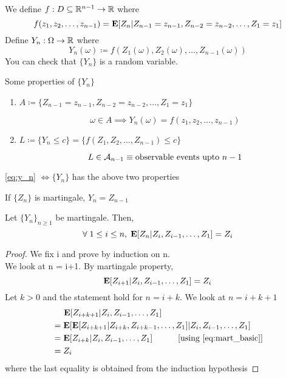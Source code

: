 \documentclass[main]{subfiles}
\begin{document}
We define $f: D \subseteq \mathbb R^{n-1} \to \mathbb R$ where
$$f(z_1, z_2, \ldots, z_{n-1}) = \mathbf E[Z_n|Z_{n-1}=z_{n-1},Z_{n-2}=z_{n-2},\ldots,Z_1=z_1]$$
Define $Y_n: \Omega \to \mathbb R$ where
\begin{equation}
    Y_n(\omega) \coloneqq f(Z_1(\omega), Z_2(\omega), \ldots, Z_{n-1}(\omega))
    \label{eq:y_n}
\end{equation}
You can check that $\{Y_n\}$ is a random variable.
\begin{property} Some properties of $\{Y_n\}$
    \begin{enumerate}
        \item
              $A \coloneqq \{Z_{n-1}=z_{n-1},Z_{n-2}=z_{n-2},\ldots,Z_1=z_1\}$

              $$\omega \in A \implies Y_n(\omega) = f(z_1, z_2, \ldots, z_{n-1})$$
        \item
              $L \coloneqq \{Y_n \leq c\} = \{f(Z_1, Z_2, \ldots, Z_{n-1}) \leq c\}$

              $$L \in \mathcal A_{n-1} \equiv \text{observable events upto }n-1$$
    \end{enumerate}
    \eqref{eq:y_n} $\iff \{Y_n\}$ has the above two properties

    \vspace{2em}
    If $\{Z_n\}$ is martingale, $Y_n = Z_{n-1}$
\end{property}
\begin{lemma}
    Let $\{Y_n\}_{n\geq 1}$ be martingale. Then,
    $$\forall\;1\leq i\leq n,\;\mathbf E[Z_n|Z_i,Z_{i-1},\ldots,Z_1] = Z_i$$
    \begin{proof}
        We fix i and prove by induction on n.\\
        We look at n = i+1. By martingale property,
        \begin{equation*}
            \mathbf E[Z_{i+1}|Z_i,Z_{i-1},\ldots,Z_1] = Z_i
            \label{eq:mart_basic}
        \end{equation*}
        Let $k>0$ and the statement hold for $n=i+k$.
        We look at $n=i+k+1$
        \begin{align*}
             & \hspace{1.4em}\mathbf E[Z_{i+k+1}|Z_i,Z_{i-1},\ldots,Z_1]                                     \\
             & = \mathbf E[\mathbf E[Z_{i+k+1}|Z_{i+k},Z_{i+k-1},\ldots,Z_1]|Z_i,Z_{i-1},\ldots,Z_1]                \\
             & = \mathbf E[Z_{i+k}|Z_i,Z_{i-1},\ldots,Z_1] \hspace{3em} [\text{using }\eqref{eq:mart_basic}] \\
             & = Z_i
        \end{align*}
        where the last equality is obtained from the induction hypothesis
    \end{proof}
\end{lemma}
\end{document}
